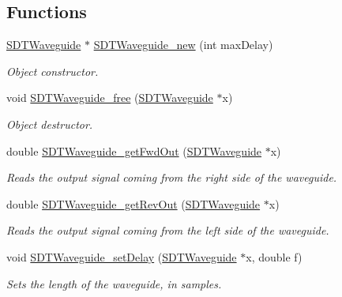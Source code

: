 \subsection*{Functions}
\begin{DoxyCompactItemize}
\item 
\hyperlink{group__waveguide_gacfb2f045a30d1c89f0dc98ad18777f3d}{S\+D\+T\+Waveguide} $\ast$ \hyperlink{group__waveguide_gab3ed884a6014c8086b9d831ac3026005}{S\+D\+T\+Waveguide\+\_\+new} (int max\+Delay)
\begin{DoxyCompactList}\small\item\em Object constructor. \end{DoxyCompactList}\item 
void \hyperlink{group__waveguide_ga66ebc31528b55b81a28dbe5639c336e2}{S\+D\+T\+Waveguide\+\_\+free} (\hyperlink{group__waveguide_gacfb2f045a30d1c89f0dc98ad18777f3d}{S\+D\+T\+Waveguide} $\ast$x)
\begin{DoxyCompactList}\small\item\em Object destructor. \end{DoxyCompactList}\item 
double \hyperlink{group__waveguide_gae64c6a70fe095d634acabc80d663fcc4}{S\+D\+T\+Waveguide\+\_\+get\+Fwd\+Out} (\hyperlink{group__waveguide_gacfb2f045a30d1c89f0dc98ad18777f3d}{S\+D\+T\+Waveguide} $\ast$x)
\begin{DoxyCompactList}\small\item\em Reads the output signal coming from the right side of the waveguide. \end{DoxyCompactList}\item 
double \hyperlink{group__waveguide_ga8fa1474553353d75238269d40ec5df6f}{S\+D\+T\+Waveguide\+\_\+get\+Rev\+Out} (\hyperlink{group__waveguide_gacfb2f045a30d1c89f0dc98ad18777f3d}{S\+D\+T\+Waveguide} $\ast$x)
\begin{DoxyCompactList}\small\item\em Reads the output signal coming from the left side of the waveguide. \end{DoxyCompactList}\item 
void \hyperlink{group__waveguide_ga7ca6f84e147153b31fb16179b5179c27}{S\+D\+T\+Waveguide\+\_\+set\+Delay} (\hyperlink{group__waveguide_gacfb2f045a30d1c89f0dc98ad18777f3d}{S\+D\+T\+Waveguide} $\ast$x, double f)
\begin{DoxyCompactList}\small\item\em Sets the length of the waveguide, in samples. \end{DoxyCompactList}\item 

\end{DoxyCompactItemize}

